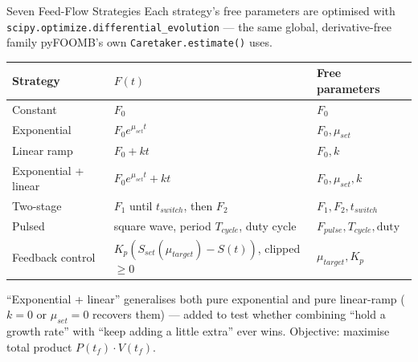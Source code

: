 \documentclass[aspectratio=169, 11pt]{beamer}
\begin{document}
\begin{frame}{Seven Feed-Flow Strategies}
  {\small Each strategy's free parameters are optimised with
  \texttt{scipy.optimize.differential\_evolution} --- the same global,
  derivative-free family pyFOOMB's own \texttt{Caretaker.estimate()} uses.}

  \vspace{0.2cm}
  \begin{center}
  \renewcommand{\arraystretch}{1.2}
  {\footnotesize
  \begin{tabular}{lll}
    \toprule
    \textbf{Strategy} & \textbf{$F(t)$} & \textbf{Free parameters} \\
    \midrule
    Constant & $F_0$ & $F_0$ \\
    Exponential & $F_0 e^{\mu_{set} t}$ & $F_0, \mu_{set}$ \\
    Linear ramp & $F_0 + kt$ & $F_0, k$ \\
    Exponential + linear & $F_0 e^{\mu_{set} t} + kt$ & $F_0, \mu_{set}, k$ \\
    Two-stage & $F_1$ until $t_{switch}$, then $F_2$ & $F_1, F_2, t_{switch}$ \\
    Pulsed & square wave, period $T_{cycle}$, duty cycle & $F_{pulse}, T_{cycle}, \text{duty}$ \\
    Feedback control & $K_p(S_{set}(\mu_{target}) - S(t))$, clipped $\geq 0$ & $\mu_{target}, K_p$ \\
    \bottomrule
  \end{tabular}
  }
  \end{center}

  \vspace{0.2cm}
  {\small ``Exponential + linear'' generalises both pure exponential and pure
  linear-ramp ($k{=}0$ or $\mu_{set}{=}0$ recovers them) --- added to test whether
  combining ``hold a growth rate'' with ``keep adding a little extra'' ever wins.
  Objective: maximise total product $P(t_f)\cdot V(t_f)$.}
\end{frame}
\end{document}

